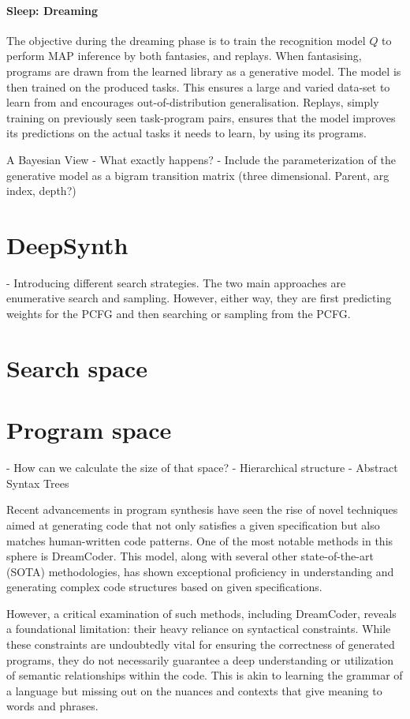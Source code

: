 \paragraph{Sleep: Dreaming} The objective during the dreaming phase is to train the recognition model $Q$ to perform MAP inference by both fantasies, and replays. When fantasising, programs are drawn from the learned library as a generative model. The model is then trained on the produced tasks. This ensures a large and varied data-set to learn from and encourages out-of-distribution generalisation. Replays, simply training on previously seen task-program pairs, ensures that the model improves its predictions on the actual tasks it needs to learn, by using its programs.

A Bayesian View
- What exactly happens?
- Include the parameterization of the generative model as a bigram transition matrix (three dimensional. Parent, arg index, depth?)


\section{DeepSynth}
- Introducing different search strategies.
The two main approaches are enumerative search and sampling.
However, either way, they are first predicting weights for the PCFG and then searching or sampling from the PCFG. 
\section{Search space}
\section{Program space}
- How can we calculate the size of that space?
- Hierarchical structure 
- Abstract Syntax Trees


Recent advancements in program synthesis have seen the rise of novel techniques aimed at generating code that not only satisfies a given specification but also matches human-written code patterns. One of the most notable methods in this sphere is DreamCoder. This model, along with several other state-of-the-art (SOTA) methodologies, has shown exceptional proficiency in understanding and generating complex code structures based on given specifications.

However, a critical examination of such methods, including DreamCoder, reveals a foundational limitation: their heavy reliance on syntactical constraints. While these constraints are undoubtedly vital for ensuring the correctness of generated programs, they do not necessarily guarantee a deep understanding or utilization of semantic relationships within the code. This is akin to learning the grammar of a language but missing out on the nuances and contexts that give meaning to words and phrases.

